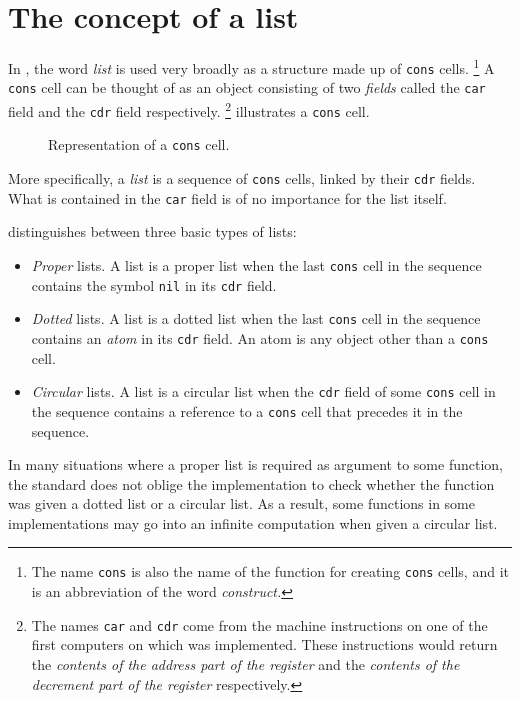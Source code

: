 \chapter{The concept of a list}
\label{chap-list-concept}

In \cl{}, the word \emph{list} is used very broadly as a structure
made up of \texttt{cons} cells.%
\footnote{The name \texttt{cons} is also the name of the function for
  creating \texttt{cons} cells, and it is an abbreviation of the word
  \emph{construct.}}  A \texttt{cons} cell can be thought of as an
object consisting of two \emph{fields} called the \texttt{car} field
and the \texttt{cdr} field respectively.%
\footnote{The names \texttt{car} and \texttt{cdr} come from the
  machine instructions on one of the first computers on which \lisp{}
  was implemented.  These instructions would return the \emph{contents
    of the address part of the register} and the \emph{contents of the
    decrement part of the register} respectively.}
 illustrates a \texttt{cons} cell.

\begin{figure}
\begin{center}
\end{center}
\caption{\label{fig-cons-cell}
Representation of a \texttt{cons} cell.}
\end{figure}

More specifically, a \emph{list} is a sequence of \texttt{cons} cells,
linked by their \texttt{cdr} fields.  What is contained in the
\texttt{car} field is of no importance for the list itself.

\cl{} distinguishes between three basic types of lists:

\begin{itemize}
\item \emph{Proper} lists.  A list is a proper list when the last
  \texttt{cons} cell in the sequence contains the symbol \texttt{nil}
  in its \texttt{cdr} field. 
\item \emph{Dotted} lists.  A list is a dotted list when the last
  \texttt{cons} cell in the sequence contains an \emph{atom}
  in its \texttt{cdr} field.  An atom is any \cl{} object other than a
  \texttt{cons} cell.
\item \emph{Circular} lists.  A list is a circular list when the
  \texttt{cdr} field of some \texttt{cons} cell in the sequence
  contains a reference to a \texttt{cons} cell that precedes it in the
  sequence. 
\end{itemize}

In many situations where a proper list is required as argument to some
function, the \cl{} standard does not oblige the implementation to
check whether the function was given a dotted list or a circular
list.  As a result, some functions in some implementations may go into
an infinite computation when given a circular list.
